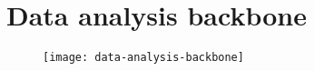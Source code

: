 

\section{Data analysis backbone}

\begin{figure}[H]
    \texttt{[image: data-analysis-backbone]}
\end{figure}
